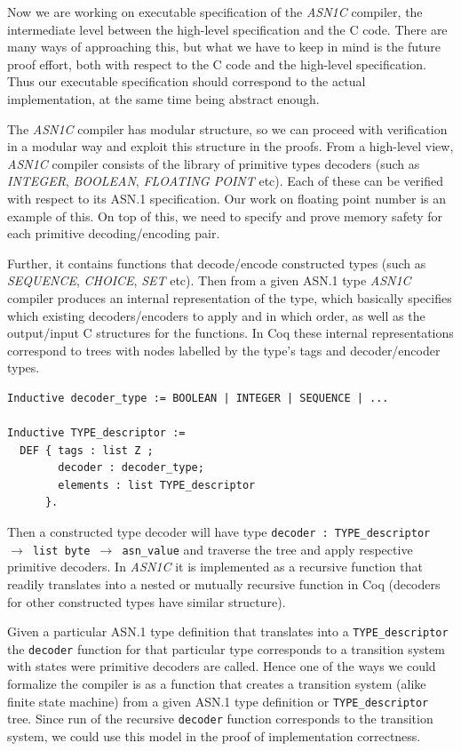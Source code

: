 \documentclass[acmsmall,nonacm]{acmart}
\begin{document}
Now we are working on executable specification of the \emph{ASN1C}
compiler, the intermediate level between the high-level specification
and the C code. There are many ways of approaching this, but what we
have to keep in mind is the future proof effort, both with respect to
the C code and the high-level specification. Thus our executable
specification should correspond to the actual implementation, at the
same time being abstract enough.

The \emph{ASN1C} compiler has modular structure, so we can proceed with
verification in a modular way and exploit this structure in the
proofs. From a high-level view, \emph{ASN1C} compiler consists of
the library of primitive types decoders (such as \emph{INTEGER}, \emph{BOOLEAN},
\emph{FLOATING POINT} etc). Each of these can be verified with respect to its
ASN.1 specification. Our work on floating point number is an example
of this. On top of this, we need to specify and prove memory safety
for each primitive decoding/encoding pair.

Further, it contains functions that decode/encode
constructed types (such as \emph{SEQUENCE}, \emph{CHOICE}, \emph{SET} etc). Then from a
given ASN.1 type \emph{ASN1C} compiler produces an internal
representation of the type, which basically specifies which existing
decoders/encoders to apply and in which order, as well as the
output/input C structures for the functions. In Coq
these internal representations correspond to trees with nodes labelled by the
type's tags and decoder/encoder types.

 \begin{lstlisting}[language=Coq]
Inductive decoder_type := BOOLEAN | INTEGER | SEQUENCE | ...

Inductive TYPE_descriptor :=
  DEF { tags : list Z ;
        decoder : decoder_type;
        elements : list TYPE_descriptor 
      }.
 \end{lstlisting}

 Then a constructed type decoder will have type \texttt{decoder : TYPE\_descriptor $\rightarrow$ list byte $\rightarrow$ asn\_value}  and traverse the tree and apply
 respective primitive decoders. In \emph{ASN1C} it is implemented as
 a recursive function that readily translates into a nested or mutually recursive
 function in Coq (decoders for other constructed types have similar
 structure).

 Given a particular ASN.1 type definition that translates into a
 \texttt{TYPE\_descriptor} the \texttt{decoder} function for that
 particular type corresponds to a transition system with states were
 primitive decoders are called. Hence one of the ways we could
 formalize the compiler is as a function that creates a transition
 system (alike finite state machine) from a given ASN.1 type
 definition or \texttt{TYPE\_descriptor} tree. Since run of the
 recursive \texttt{decoder} function corresponds to the transition
 system, we could use this model in the proof of implementation
 correctness.
\end{document}
